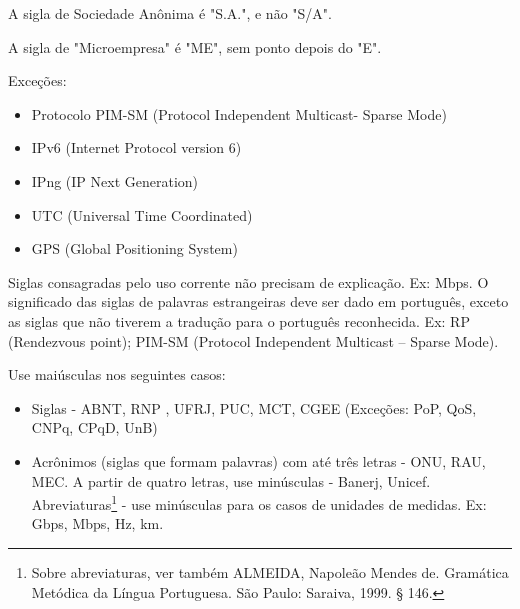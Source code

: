 A sigla de Sociedade Anônima é "S.A.", e não "S/A". 

A sigla de "Microempresa" é "ME", sem ponto depois do "E".

Exceções:
\begin{itemize}
\item Protocolo PIM-SM (Protocol Independent Multicast- Sparse Mode)
\item IPv6 (Internet Protocol version 6)
\item IPng (IP Next Generation)
\item UTC (Universal Time Coordinated)
\item GPS (Global Positioning System)
\end{itemize}

Siglas consagradas pelo uso corrente não precisam de explicação. Ex: Mbps. O significado das siglas de palavras estrangeiras deve ser dado em português, exceto as siglas que não tiverem a tradução para o português reconhecida. Ex: RP (Rendezvous point); PIM-SM (Protocol Independent Multicast – Sparse Mode).

Use maiúsculas nos seguintes casos:

\begin{itemize}
\item Siglas - ABNT, RNP , UFRJ, PUC, MCT, CGEE (Exceções: PoP, QoS, CNPq, CPqD, UnB)
\item Acrônimos (siglas que formam palavras) com até três letras - ONU, RAU, MEC. A partir de quatro letras, use minúsculas - Banerj, Unicef.
Abreviaturas\footnote[1]{Sobre abreviaturas, ver também ALMEIDA, Napoleão Mendes de. Gramática Metódica da Língua Portuguesa. São Paulo: Saraiva, 1999. § 146.}
 - use minúsculas para os casos de unidades de medidas. Ex: Gbps, Mbps, Hz, km.
\end{itemize}

